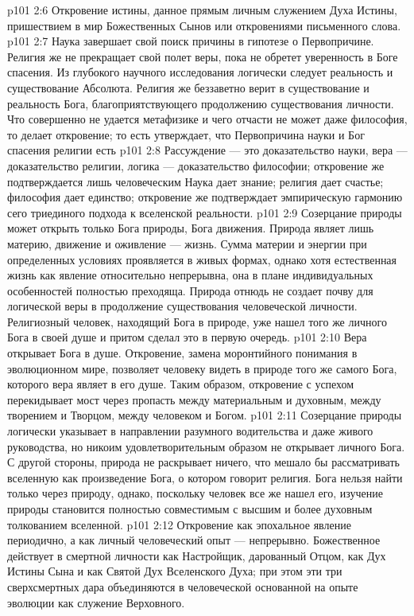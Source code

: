 \vs p101 2:6 \bibnobreakspace Откровение истины, данное прямым личным служением Духа Истины, пришествием в мир Божественных Сынов или откровениями письменного слова.
\vs p101 2:7 \pc Наука завершает свой поиск причины в гипотезе о Первопричине. Религия же не прекращает свой полет веры, пока не обретет уверенность в Боге спасения. Из глубокого научного исследования логически следует реальность и существование Абсолюта. Религия же беззаветно верит в существование и реальность Бога, благоприятствующего продолжению существования личности. Что совершенно не удается метафизике и чего отчасти не может даже философия, то делает откровение; то есть утверждает, что Первопричина науки и Бог спасения религии есть 
\vs p101 2:8 \pc Рассуждение --- это доказательство науки, вера --- доказательство религии, логика --- доказательство философии; откровение же подтверждается лишь человеческим  Наука дает знание; религия дает счастье; философия дает единство; откровение же подтверждает эмпирическую гармонию сего триединого подхода к вселенской реальности.
\vs p101 2:9 Созерцание природы может открыть только Бога природы, Бога движения. Природа являет лишь материю, движение и оживление --- жизнь. Сумма материи и энергии при определенных условиях проявляется в живых формах, однако хотя естественная жизнь как явление относительно непрерывна, она в плане индивидуальных особенностей полностью преходяща. Природа отнюдь не создает почву для логической веры в продолжение существования человеческой личности. Религиозный человек, находящий Бога в природе, уже нашел того же личного Бога в своей душе и притом сделал это в первую очередь.
\vs p101 2:10 \pc Вера открывает Бога в душе. Откровение, замена моронтийного понимания в эволюционном мире, позволяет человеку видеть в природе того же самого Бога, которого вера являет в его душе. Таким образом, откровение с успехом перекидывает мост через пропасть между материальным и духовным, между творением и Творцом, между человеком и Богом.
\vs p101 2:11 Созерцание природы логически указывает в направлении разумного водительства и даже живого руководства, но никоим удовлетворительным образом не открывает личного Бога. С другой стороны, природа не раскрывает ничего, что мешало бы рассматривать вселенную как произведение Бога, о котором говорит религия. Бога нельзя найти только через природу, однако, поскольку человек все же нашел его, изучение природы становится полностью совместимым с высшим и более духовным толкованием вселенной.
\vs p101 2:12 \pc Откровение как эпохальное явление периодично, а как личный человеческий опыт --- непрерывно. Божественное действует в смертной личности как Настройщик, дарованный Отцом, как Дух Истины Сына и как Святой Дух Вселенского Духа; при этом эти три сверхсмертных дара объединяются в человеческой основанной на опыте эволюции как служение Верховного.
